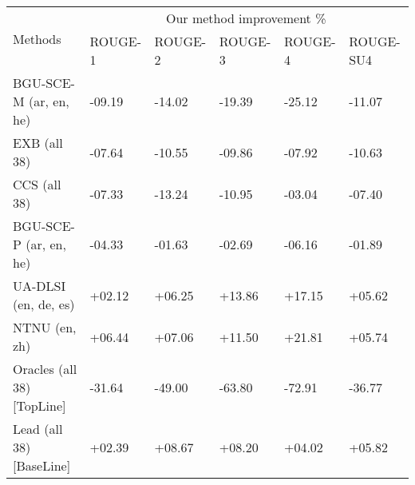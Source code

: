 \begin{tabular}{p{8cm}p{4cm}p{4cm}p{4cm}p{4cm}p{5cm}} 
\hline \hline
\multirow{2}{*}{Methods} & \multicolumn{5}{c}{Our method improvement \%}\\
\cline{2-6}
							& ROUGE-1	& ROUGE-2	& ROUGE-3	& ROUGE-4	& ROUGE-SU4\\
\hline
BGU-SCE-M (ar, en, he)		& -09.19	& -14.02	& -19.39	& -25.12	& -11.07\\
EXB (all 38)				& -07.64	& -10.55	& -09.86	& -07.92	& -10.63\\
CCS (all 38)				& -07.33	& -13.24	& -10.95	& -03.04	& -07.40\\
BGU-SCE-P (ar, en, he)		& -04.33	& -01.63	& -02.69	& -06.16	& -01.89\\
UA-DLSI (en, de, es)		& +02.12	& +06.25	& +13.86	& +17.15	& +05.62\\
NTNU (en, zh)				& +06.44	& +07.06	& +11.50	& +21.81	& +05.74\\
\hline
Oracles (all 38) [TopLine]	& -31.64	& -49.00	& -63.80	& -72.91	& -36.77\\
Lead (all 38) [BaseLine]	& +02.39	& +08.67	& +08.20	& +04.02	& +05.82\\
\hline \hline
\end{tabular}
